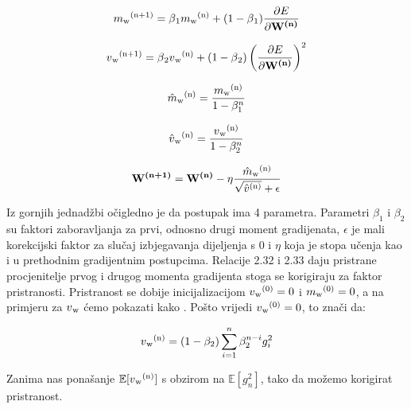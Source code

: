 \documentclass[times, utf8, diplomski]{fer}
\begin{document}
\begin{equation}
m\textsubscript{w}\textsuperscript{(n+1)} = \beta\textsubscript{1}m\textsubscript{w}\textsuperscript{(n)} + (1 - \beta\textsubscript{1})\frac{\partial E}{\partial \textbf{W\textsuperscript{(n)}}}
\end{equation}

\begin{equation}
v\textsubscript{w}\textsuperscript{(n+1)} = \beta\textsubscript{2}v\textsubscript{w}\textsuperscript{(n)} + (1 - \beta\textsubscript{2})\left(\frac{\partial E}{\partial \textbf{W\textsuperscript{(n)}}}\right)^2
\end{equation}

\begin{equation}
\hat{m}\textsubscript{w}\textsuperscript{(n)} = \frac{m\textsubscript{w}\textsuperscript{(n)}}{1 - \beta_{1}^n}
\end{equation}

\begin{equation}
\hat{v}\textsubscript{w}\textsuperscript{(n)} = \frac{v\textsubscript{w}\textsuperscript{(n)}}{1 - \beta_{2}^n}
\end{equation}

\begin{equation}
\textbf{W\textsuperscript{(n+1)}} = \textbf{W\textsuperscript{(n)}} - \eta\frac{\hat{m}\textsubscript{w}\textsuperscript{(n)}}{\sqrt{\hat{v}\textsuperscript{(n)}} + \epsilon}
\end{equation}

Iz gornjih jednadžbi očigledno je da postupak ima 4 parametra. Parametri $\beta_1$ i $\beta_2$ su faktori zaboravljanja za prvi, odnosno drugi moment gradijenata, $\epsilon$ je mali korekcijski faktor za slučaj izbjegavanja dijeljenja s $0$ i $\eta$ koja je stopa učenja kao i u prethodnim gradijentnim postupcima. Relacije 2.32 i 2.33 daju pristrane procjenitelje prvog i drugog momenta gradijenta stoga se korigiraju za faktor pristranosti. Pristranost se dobije inicijalizacijom $v\textsubscript{w}\textsuperscript{(0)} = 0$ i $m\textsubscript{w}\textsuperscript{(0)} = 0$, a na primjeru za $v\textsubscript{w}$ ćemo pokazati kako \cite{adam}. Pošto vrijedi $v\textsubscript{w}\textsuperscript{(0)} = 0$, to znači da:

\begin{equation}
v\textsubscript{w}\textsuperscript{(n)} = (1 - \beta_2)\sum_{i=1}^n \beta_2^{n-i}g_i^2
\end{equation}

Zanima nas ponašanje $\mathbb{E}[v\textsubscript{w}\textsuperscript{(n)}]$ s obzirom na $\mathbb{E}[g_n^2]$, tako da možemo korigirat pristranost.
\end{document}
